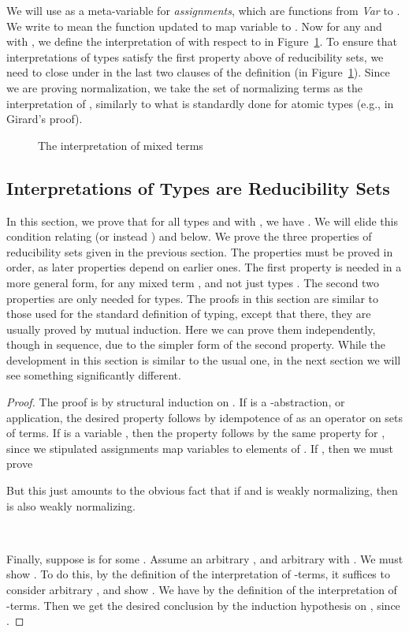\documentclass{LMCS}
\begin{document}
We will use  as a meta-variable for \emph{assignments}, which are
functions from \textit{Var} to .  We write  to
mean the function  updated to map variable  to
.  Now for any  and  with
, we define the
interpretation  of  with respect to  in
Figure~\ref{fig:interp}.  To ensure that interpretations of types
satisfy the first property above of reducibility sets, we need
to close under  in the last two clauses of the definition
(in Figure~\ref{fig:interp}).  Since we are proving normalization, we
take the set of normalizing terms as the interpretation of ,
similarly to what is standardly done for atomic types (e.g., in
Girard's proof).

\begin{figure}

\caption{The interpretation of mixed terms}
\label{fig:interp}
\end{figure}

\subsection{Interpretations of Types are Reducibility Sets}

In this section, we prove that for all types  and  with
, we have
.  We will elide this condition
relating  (or instead ) and  below.  We prove the three
properties of reducibility sets given in the previous section.
The properties must be proved in order, as later properties depend on
earlier ones.  The first property is needed in a more general form,
for any mixed term , and not just types .  The second two
properties are only needed for types.  The proofs in this section are
similar to those used for the standard definition of typing, except
that there, they are usually proved by mutual induction.  Here we can
prove them independently, though in sequence, due to the simpler form
of the second property.  While the development in this section is
similar to the usual one, in the next section we will see something
significantly different.

\begin{lem}
\label{lem1}

\end{lem}
\begin{proof} The proof is by structural induction on .  If  is a -abstraction,
or application, the desired property follows by idempotence of
 as an operator on sets of terms.  If  is a variable ,
then the property follows by the same property for , since we
stipulated assignments map variables to elements of .  If
, then we must prove

\noindent But this just amounts to the obvious fact that if  and  is weakly normalizing, then  is also weakly
normalizing.

\

\noindent Finally, suppose  is  for some .  Assume an
arbitrary , and arbitrary  with
.  We must show .  To do
this, by the definition of the interpretation of -terms, it
suffices to consider arbitrary , and show
.  We have  by
the definition of the interpretation of -terms.  Then we get the
desired conclusion by the induction hypothesis on , since
.
\end{proof}
\end{document}
